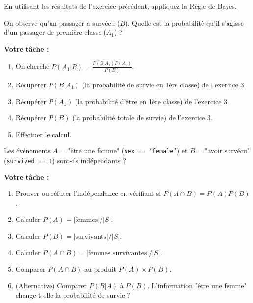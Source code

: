\begin{exercicebox}
En utilisant les résultats de l'exercice précédent, appliquez la Règle de Bayes.

On observe qu'un passager a survécu ($B$). Quelle est la probabilité qu'il s'agisse d'un passager de première classe ($A_1$) ?

\textbf{Votre tâche :}
\begin{enumerate}
    \item On cherche $P(A_1|B) = \frac{P(B|A_1)P(A_1)}{P(B)}$.
    \item Récupérer $P(B|A_1)$ (la probabilité de survie en 1ère classe) de l'exercice 3.
    \item Récupérer $P(A_1)$ (la probabilité d'être en 1ère classe) de l'exercice 3.
    \item Récupérer $P(B)$ (la probabilité totale de survie) de l'exercice 3.
    \item Effectuer le calcul.
\end{enumerate}
\end{exercicebox}

\begin{exercicebox}
Les événements $A$ = "être une femme" (\texttt{sex == 'female'}) et $B$ = "avoir survécu" (\texttt{survived == 1}) sont-ils indépendants ?

\textbf{Votre tâche :}
\begin{enumerate}
    \item Prouver ou réfuter l'indépendance en vérifiant si $P(A \cap B) = P(A)P(B)$.
    \item Calculer $P(A) = |\text{femmes}| / |S|$.
    \item Calculer $P(B) = |\text{survivants}| / |S|$.
    \item Calculer $P(A \cap B) = |\text{femmes survivantes}| / |S|$.
    \item Comparer $P(A \cap B)$ au produit $P(A) \times P(B)$.
    \item (Alternative) Comparer $P(B|A)$ à $P(B)$. L'information "être une femme" change-t-elle la probabilité de survie ?
\end{enumerate}
\end{exercicebox}